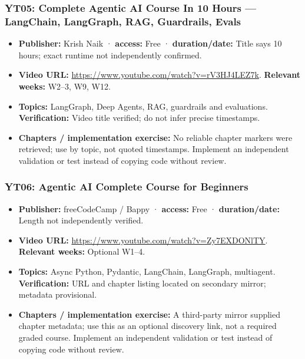 \documentclass[
  10pt,
]{article}
\providecommand{\tightlist}{%
  \setlength{\itemsep}{0pt}\setlength{\parskip}{0pt}}
\begin{document}
\subsubsection{YT05: Complete Agentic AI Course In 10 Hours ---
LangChain, LangGraph, RAG, Guardrails,
Evals}\label{yt05-complete-agentic-ai-course-in-10-hours-langchain-langgraph-rag-guardrails-evals}

\begin{itemize}
\tightlist
\item
  \textbf{Publisher:} Krish Naik · \textbf{access:} Free ·
  \textbf{duration/date:} Title says 10 hours; exact runtime not
  independently confirmed.
\item
  \textbf{Video URL:} \url{https://www.youtube.com/watch?v=rV3HJ4LEZ7k}.
  \textbf{Relevant weeks:} W2--3, W9, W12.
\item
  \textbf{Topics:} LangGraph, Deep Agents, RAG, guardrails and
  evaluations. \textbf{Verification:} Video title verified; do not infer
  precise timestamps.
\item
  \textbf{Chapters / implementation exercise:} No reliable chapter
  markers were retrieved; use by topic, not quoted timestamps. Implement
  an independent validation or test instead of copying code without
  review.
\end{itemize}

\subsubsection{YT06: Agentic AI Complete Course for
Beginners}\label{yt06-agentic-ai-complete-course-for-beginners}

\begin{itemize}
\tightlist
\item
  \textbf{Publisher:} freeCodeCamp / Bappy · \textbf{access:} Free ·
  \textbf{duration/date:} Length not independently verified.
\item
  \textbf{Video URL:} \url{https://www.youtube.com/watch?v=Zy7EXDONlTY}.
  \textbf{Relevant weeks:} Optional W1--4.
\item
  \textbf{Topics:} Async Python, Pydantic, LangChain, LangGraph,
  multiagent. \textbf{Verification:} URL and chapter listing located on
  secondary mirror; metadata provisional.
\item
  \textbf{Chapters / implementation exercise:} A third-party mirror
  supplied chapter metadata; use this as an optional discovery link, not
  a required graded course. Implement an independent validation or test
  instead of copying code without review.
\end{itemize}
\end{document}
